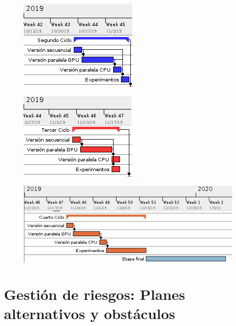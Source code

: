 \documentclass[titlepage,12pt]{report}
\begin{document}
\begin{figure}[H]
\centering
\begin{minipage}{.5\textwidth}
  \centering
  \includegraphics[scale=0.75]{media/gantt_3.png} %
  \label{gantt_3}
\end{minipage}%
\begin{minipage}{.5\textwidth}
  \centering
  \includegraphics[scale=0.75]{media/gantt_4.png}
  \label{gantt_4}
\end{minipage}
\end{figure}

\begin{figure}[H]
\centering
\includegraphics[scale=0.5]{media/gantt_5.png}
\label{gantt_5}
\end{figure}

\section{Gestión de riesgos: Planes alternativos y obstáculos}
\end{document}
